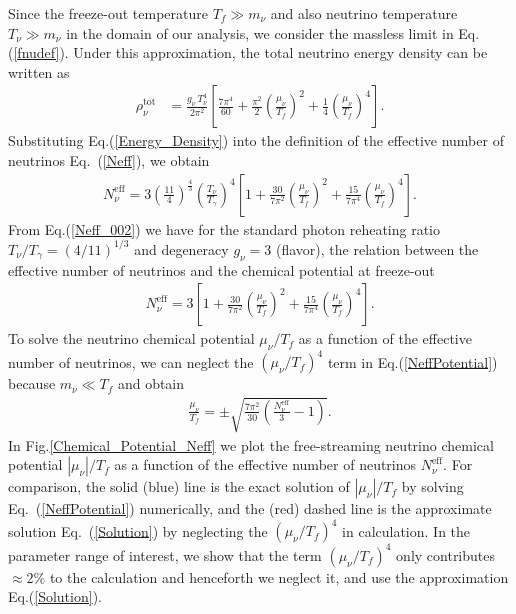 Since the freeze-out temperature $T_f\gg m_\nu$ and also neutrino temperature $T_\nu\gg m_\nu$ in the domain of our analysis, we consider the massless limit in Eq.\;(\ref{fnudef}). Under this approximation, the total neutrino energy density can be written as
\begin{align}
\label{Energy_Density}
\rho_\nu^{\mathrm{tot}}
&=\frac{g_\nu\,T_\nu^4}{2\pi^2}\left[\frac{7\pi^4}{60}+\frac{\pi^2}{2}\left(\frac{\mu_\nu}{T_f}\right)^{\!\!2}+\frac{1}{4}\left(\frac{\mu_\nu}{T_f}\right)^{\!\!4}\right].
\end{align}
Substituting Eq.\;(\ref{Energy_Density}) into the definition of the effective number of neutrinos Eq.~(\ref{Neff}), we obtain 
\begin{align}
\label{Neff_002}
N_\nu^{\mathrm{eff}}\!\!
=\!3\!\left(\frac{11}{4}\right)^{\!\!\frac{4}{3}}\!\!\left(\frac{T_\nu}{T_\gamma}\right)^{\!\!4}\!
\left[1\!+\!\frac{30}{7\pi^2}\!\!\left(\frac{\mu_\nu}{T_f}\right)^{\!\!2} 
\!\!+\frac{15}{7\pi^4}\!\!\left(\frac{\mu_\nu}{T_f}\right)^{\!\!4}\right].
\end{align}
From Eq.\;(\ref{Neff_002}) we have for the standard photon reheating ratio $T_\nu/T_\gamma=(4/11)^{1/3}$ \cite{Kolb:1990vq} and degeneracy $g_\nu=3$ (flavor), the relation between the effective number of neutrinos and the chemical potential at freeze-out
\begin{align}
\label{NeffPotential}
N_\nu^{\mathrm{eff}}=3\left[1+\frac{30}{7\pi^2}\left(\frac{\mu_\nu}{T_f}\right)^{\!\!2}+ \frac{15}{7\pi^4} \left(\frac{\mu_\nu}{T_f}\right)^{\!\!4}\right].
\end{align}
To solve the neutrino chemical potential $\mu_\nu/T_f$ as a function of the effective number of neutrinos, we can neglect the $(\mu_\nu/T_f)^4$ term in Eq.\;(\ref{NeffPotential}) because $m_\nu\ll T_f$ and obtain
\begin{align}\label{Solution}
\frac{\mu_\nu}{T_f}=\pm\sqrt{\frac{7\pi^2}{30}\left(\frac{N_\nu^{\mathrm{eff}}}{3}-1\right)}.
\end{align}
In Fig.\;\ref{Chemical_Potential_Neff} we plot the free-streaming neutrino chemical potential $|\mu_\nu|/T_f$ as a function of the effective number of neutrinos $N_\nu^{\mathrm{eff}}$. For comparison, the solid (blue) line is the exact solution of $|\mu_\nu|/T_f$ by solving Eq.~(\ref{NeffPotential}) numerically, and the (red) dashed line is the approximate solution Eq.~(\ref{Solution}) by neglecting the $(\mu_\nu/T_f)^4$ in calculation. In the parameter range of interest, we show that the term $(\mu_\nu/T_f)^4$ only contributes $\approx 2\%$ to the calculation and henceforth we neglect it, and use the approximation Eq.\;(\ref{Solution}). 

